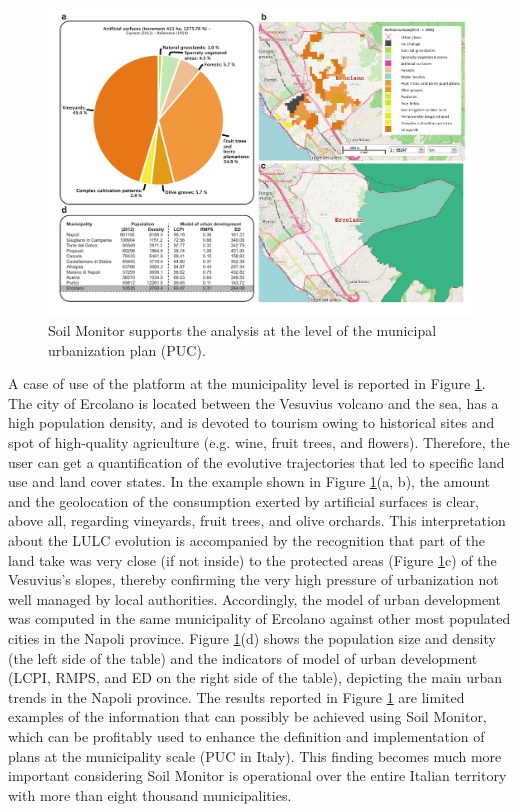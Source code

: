 \documentclass[APA,LATO1COL,doublespace]{WileyNJD-v2}
\begin{document}
\begin{figure}[t] %
    \centerline{\includegraphics[width=450pt]{Figure06.pdf}}
    \caption{ Soil Monitor supports the analysis at the level of the municipal urbanization plan (PUC). } \label{fig:caseCOM}
\end{figure}

A case of use of the platform at the municipality level is reported in Figure \ref{fig:caseCOM}. 
The city of Ercolano is located between the Vesuvius volcano and the sea, has a high population density, and is devoted to tourism owing to historical sites and spot of high-quality agriculture (e.g. wine, fruit trees, and flowers). 
Therefore, the user can get a quantification of the evolutive trajectories that led to specific land use and land cover states. 
In the example shown in Figure \ref{fig:caseCOM}(a, b), the amount and the geolocation of the consumption exerted by artificial surfaces is clear, above all, regarding vineyards, fruit trees, and olive orchards. 
This interpretation about the LULC evolution is accompanied by the recognition that part of the land take was very close (if not inside) to the protected areas (Figure \ref{fig:caseCOM}c) of the Vesuvius's slopes, thereby confirming the very high pressure of urbanization not well managed by local authorities.
Accordingly, the model of urban development was computed in the same municipality of Ercolano against other most populated cities in the Napoli province. 
Figure \ref{fig:caseCOM}(d) shows the population size and density (the left side of the table) and the indicators of model of urban development (LCPI, RMPS, and ED on the right side of the table), depicting the main urban trends in the Napoli province. 
The results reported in Figure \ref{fig:caseCOM} are limited examples of the information that can possibly be achieved using Soil Monitor, which can be profitably used to enhance the definition and implementation of plans at the municipality scale (PUC in Italy). 
This finding becomes much more important considering Soil Monitor is operational over the entire Italian territory with more than eight thousand municipalities.
\end{document}
